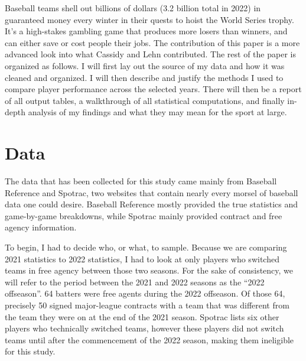 \documentclass[10pt]{article}
\begin{document}
Baseball teams shell out billions of dollars (3.2 billion total in 2022) in guaranteed money every winter in their quests to 
hoist the World Series trophy. It’s a high-stakes gambling game that produces more losers than winners, and can either save or 
cost people their jobs. The contribution of this paper is a more advanced look into what Cassidy and Lehn contributed. The rest 
of the paper is organized as follows. I will first lay out the source of my data and how it was cleaned and organized. I will 
then describe and justify the methods I used to compare player performance across the selected years. There will then be a 
report of all output tables, a walkthrough of all statistical computations, and finally in-depth analysis of my findings 
and what they may mean for the sport at large. 

\section{Data}

The data that has been collected for this study came mainly from Baseball Reference and Spotrac, two websites that contain 
nearly every morsel of baseball data one could desire. Baseball Reference mostly provided the true statistics and game-by-game 
breakdowns, while Spotrac mainly provided contract and free agency information. 

To begin, I had to decide who, or what, to sample. Because we are comparing 2021 statistics to 2022 statistics, I had to look 
at only players who switched teams in free agency between those two seasons. For the sake of consistency, we will refer to the 
period between the 2021 and 2022 seasons as the “2022 offseason”. 64 batters were free agents during the 2022 
offseason. Of those 64, precisely 50 signed major-league contracts with a team that was different from the team they were on 
at the end of the 2021 season. Spotrac lists six other players who technically switched teams, however these players did not 
switch teams until after the commencement of the 2022 season, making them ineligible for this study.
\end{document}

